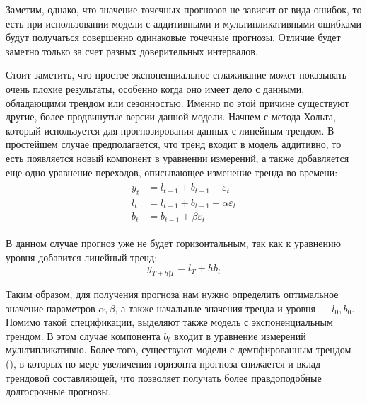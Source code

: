 Заметим, однако, что значение точечных прогнозов не зависит от вида ошибок, то есть при использовании модели с аддитивными и мультипликативными ошибками будут получаться совершенно одинаковые точечные прогнозы. Отличие будет заметно только за счет разных доверительных интервалов. 

Стоит заметить, что простое экспоненциальное сглаживание может показывать очень плохие результаты, особенно когда оно имеет дело с данными, обладающими трендом или сезонностью. Именно по этой причине существуют другие, более продвинутые версии данной модели. Начнем с метода Хольта, который используется для прогнозирования данных с линейным трендом. В простейшем случае предполагается, что тренд входит в модель аддитивно, то есть появляется новый компонент в уравнении измерений, а также добавляется еще одно уравнение переходов, описывающее изменение тренда во времени:
\begin{align}
\begin{split} \label{ssm_holt}
y_t &= l_{t-1} + b_{t-1} + \varepsilon_t\\
l_t &= l_{t-1} + b_{t-1} + \alpha \varepsilon_t\\
b_t &= b_{t-1} + \beta \varepsilon_t
\end{split}
\end{align}

В данном случае прогноз уже не будет горизонтальным, так как к уравнению уровня добавится линейный тренд:
\begin{equation*}
y_{T+h|T} = l_T + hb_t
\end{equation*}

Таким образом, для получения прогноза нам нужно определить оптимальное значение параметров $\alpha, \beta$, а также начальные значения тренда и уровня --- $l_0, b_0$. Помимо такой спецификации, выделяют также модель с экспоненциальным трендом. В этом случае компонента $b_t$ входит в уравнение измерений мультипликативно. Более того, существуют модели с демпфированным трендом (), в которых по мере увеличения горизонта прогноза снижается и вклад трендовой составляющей, что позволяет получать более правдоподобные долгосрочные прогнозы.

